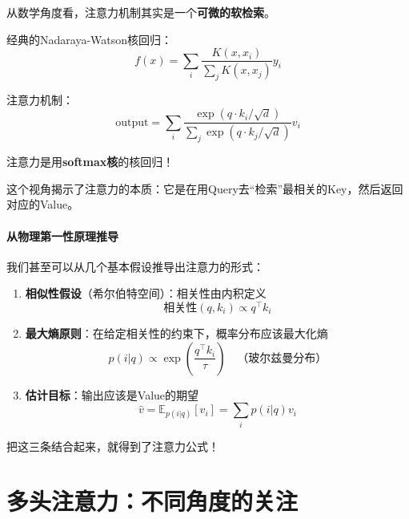 从数学角度看，注意力机制其实是一个\textbf{可微的软检索}。

\begin{keyidea}[注意力 = 核回归]
经典的Nadaraya-Watson核回归：
\begin{equation}
    f(x) = \sum_i \frac{K(x, x_i)}{\sum_j K(x, x_j)} y_i
\end{equation}

注意力机制：
\begin{equation}
    \text{output} = \sum_i \frac{\exp(q \cdot k_i / \sqrt{d})}{\sum_j \exp(q \cdot k_j / \sqrt{d})} v_i
\end{equation}

注意力是用\textbf{softmax核}的核回归！
\end{keyidea}

这个视角揭示了注意力的本质：它是在用Query去“检索”最相关的Key，然后返回对应的Value。

\paragraph{从物理第一性原理推导}

我们甚至可以从几个基本假设推导出注意力的形式：

\begin{enumerate}
    \item \textbf{相似性假设}（希尔伯特空间）：相关性由内积定义
    \begin{equation}
        \text{相关性}(q, k_i) \propto q^\top k_i
    \end{equation}
    
    \item \textbf{最大熵原则}：在给定相关性的约束下，概率分布应该最大化熵
    \begin{equation}
        p(i|q) \propto \exp\left(\frac{q^\top k_i}{\tau}\right) \quad \text{（玻尔兹曼分布）}
    \end{equation}
    
    \item \textbf{估计目标}：输出应该是Value的期望
    \begin{equation}
        \hat{v} = \mathbb{E}_{p(i|q)}[v_i] = \sum_i p(i|q) v_i
    \end{equation}
\end{enumerate}

把这三条结合起来，就得到了注意力公式！

\section{多头注意力：不同角度的关注}

